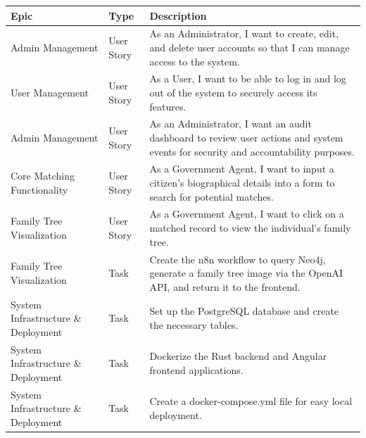 \begin{center}
\begin{tabular}{|p{3cm}|l|p{6cm}|}
\hline
\textbf{Epic} & \textbf{Type} & \textbf{Description} \\
\hline
\hline
Admin Management & User Story & As an Administrator, I want to create, edit, and delete user accounts so that I can manage access to the system. \\
\hline
User Management & User Story & As a User, I want to be able to log in and log out of the system to securely access its features. \\
\hline
Admin Management & User Story & As an Administrator, I want an audit dashboard to review user actions and system events for security and accountability purposes. \\
\hline
\hline
Core Matching Functionality & User Story & As a Government Agent, I want to input a citizen's biographical details into a form to search for potential matches. \\
\hline
\hline
Family Tree Visualization & User Story & As a Government Agent, I want to click on a matched record to view the individual's family tree. \\
\hline
Family Tree Visualization & Task & Create the n8n workflow to query Neo4j, generate a family tree image via the OpenAI API, and return it to the frontend. \\
\hline
\hline
System Infrastructure \& Deployment & Task & Set up the PostgreSQL database and create the necessary tables. \\
\hline
System Infrastructure \& Deployment & Task & Dockerize the Rust backend and Angular frontend applications. \\
\hline
System Infrastructure \& Deployment & Task & Create a docker-compose.yml file for easy local deployment. \\
\hline
\end{tabular}
\end{center}

